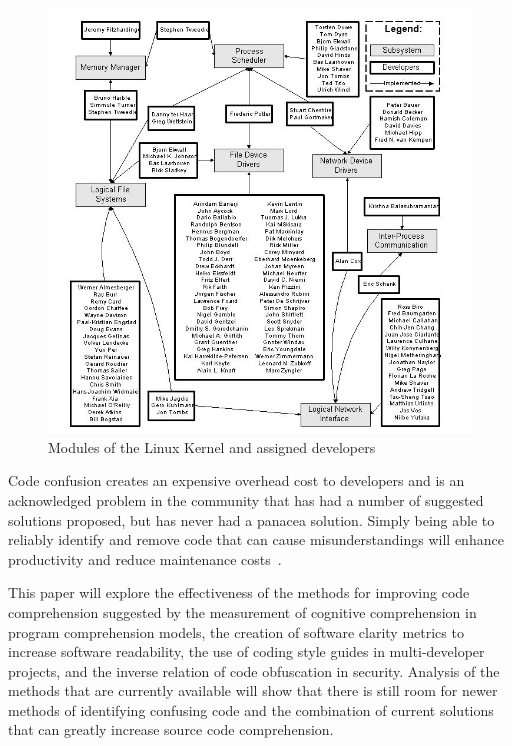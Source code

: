 \begin{figure}%
\centering
\includegraphics[scale=.75]{images/LinuxKernel}
\caption{Modules of the Linux Kernel and assigned developers \cite{noauthor_conceptual_nodate}}
\label{fig:kern}
\end{figure}

Code confusion creates an expensive overhead cost to developers 
and is an acknowledged problem in the community 
that has had a number of suggested solutions proposed, but has 
never had a panacea solution. Simply
being able to reliably identify and remove code that can cause 
misunderstandings will enhance productivity and reduce maintenance 
costs~\cite{gopstein_understanding_2017}.

This paper will explore the effectiveness of the methods for 
improving code comprehension suggested by the 
measurement of cognitive comprehension in program comprehension 
models, the creation of software clarity metrics to 
increase software readability, the use of coding style guides in 
multi-developer projects, and the inverse relation of
code obfuscation in security. Analysis of the methods that are 
currently available will show that there is still room 
for newer methods of identifying confusing code and the 
combination of current solutions that can greatly increase source 
code comprehension.

